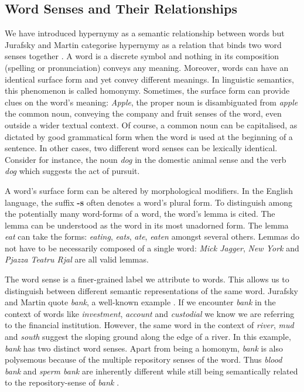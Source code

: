\subsection{Word Senses and Their Relationships}
We have introduced hypernymy as a semantic relationship between words but Jurafsky and Martin categorise hypernymy as a relation that binds two word senses together \citep{Jurafsky2009}.  A word is a discrete symbol and nothing in its composition (spelling or pronunciation) conveys any meaning.  Moreover, words can have an identical surface form and yet convey different meanings.  In linguistic semantics, this phenomenon is called homonymy.  Sometimes, the surface form can provide clues on the word’s meaning: \textit{Apple}, the proper noun is disambiguated from \textit{apple} the common noun, conveying the company and fruit senses of the word, even outside a wider textual context.  Of course, a common noun can be capitalised, as dictated by good grammatical form when the word is used at the beginning of a sentence.  In other cases, two different word senses can be lexically identical.  Consider for instance, the noun \textit{dog} in the domestic animal sense and the verb \textit{dog} which suggests the act of pursuit.  

A word’s surface form can be altered by morphological modifiers.  In the English language, the suffix \textbf{-s} often denotes a word’s plural form.  To distinguish among the potentially many word-forms of a word, the word’s lemma is cited.  The lemma can be understood as the word in its most unadorned form.  The lemma \textit{eat} can take the forms: \textit{eating}, \textit{eats}, \textit{ate}, \textit{eaten} amongst several others.  Lemmas do not have to be necessarily composed of a single word: \textit{Mick Jagger}, \textit{New York} and \textit{Pjazza Teatru Rjal} are all valid lemmas.

The word sense is a finer-grained label we attribute to words.  This allows us to distinguish between different semantic representations of the same word.  Jurafsky and Martin quote \textit{bank}, a well-known example \citep{Jurafsky2009}.  If we encounter \textit{bank} in the context of words like \textit{investment}, \textit{account} and \textit{custodial} we know we are referring to the financial institution.  However, the same word in the context of \textit{river}, \textit{mud} and \textit{south} suggest the sloping ground along the edge of a river.  In this example, \textit{bank} has two distinct word senses.  Apart from being a homonym, \textit{bank} is also polysemous because of the multiple repository senses of the word.  Thus \textit{blood bank} and \textit{sperm bank} are inherently different while still being semantically related to the repository-sense of \textit{bank} \citep{Jurafsky2009}.

